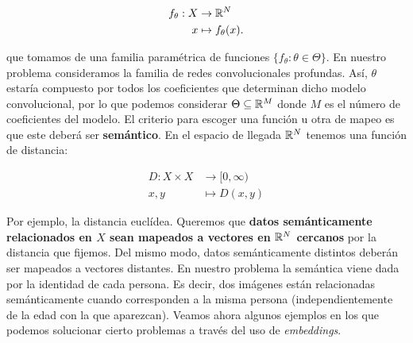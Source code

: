 \begin{equation}
	\begin{split}
		f_{\theta}: X & \to \mathbb{R}^N \\
		x & \mapsto f_{\theta}(x).
	\end{split}
\end{equation}

que tomamos de una familia paramétrica de funciones $\{f_{\theta}: \theta \in \Theta \}$. En nuestro problema consideramos la familia de redes convolucionales profundas. Así, $\theta$ estaría compuesto por todos los coeficientes que determinan dicho modelo convolucional, por lo que podemos considerar $\Theta \subseteq \mathbb{R}^M$ donde $M$ es el número de coeficientes del modelo. El criterio para escoger una función u otra de mapeo es que este deberá ser \textbf{semántico}. En el espacio de llegada $\mathbb{R}^N$ tenemos una función de distancia:

\begin{equation}
	\begin{split}
		D: X \times X & \to [0, \infty) \\
		x, y & \mapsto D(x, y)
	\end{split}
\end{equation}

Por ejemplo, la distancia euclídea. Queremos que \textbf{datos semánticamente relacionados en $X$ sean mapeados a vectores en $\mathbb{R}^N$ cercanos} por la distancia que fijemos. Del mismo modo, datos semánticamente distintos deberán ser mapeados a vectores distantes. En nuestro problema la semántica viene dada por la identidad de cada persona. Es decir, dos imágenes están relacionadas semánticamente cuando corresponden a la misma persona (independientemente de la edad con la que aparezcan). Veamos ahora algunos ejemplos en los que podemos solucionar cierto problemas a través del uso de \textit{embeddings}.

